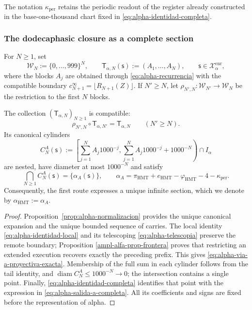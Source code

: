 The notation \(\kappa_{\mathrm{per}}\) retains the periodic readout of the register already constructed in the base-one-thousand chart fixed in \eqref{eq:alpha-identidad-completa}.

\subsubsection{The dodecaphasic closure as a complete section}

For \(N\geq1\), set
\[
 \mathcal W_N:=\{0,\ldots,999\}^{N},
 \qquad
 \mathsf T_{\alpha,N}(\mathsf s):=(A_1,\ldots,A_N),
 \qquad \mathsf s\in\mathcal X_{\alpha}^{\mathrm{enr}},
\]
where the blocks \(A_j\) are obtained through
\eqref{eq:alpha-recurrencia} with the compatible boundary
\(c_{N+1}^{\infty}=\lfloor R_{N+1}(Z)\rfloor\). If \(N'\geq N\), let
\(\rho_{N',N}:\mathcal W_{N'}\to\mathcal W_N\) be the restriction to the
first \(N\) blocks.

\begin{theorem}
\label{thm:alpha-salida-dodecafasica-completa}
The collection \((\mathsf T_{\alpha,N})_{N\geq1}\) is compatible:
\begin{equation}
 \rho_{N',N}\circ\mathsf T_{\alpha,N'}
 =\mathsf T_{\alpha,N}
 \qquad(N'\geq N).
 \label{eq:alpha-via-a-proyectiva-exacta}
\end{equation}
Its canonical cylinders
\begin{equation}
 C_N^A(\mathsf s):=
 \left[
  \sum_{j=1}^{N}A_j1000^{-j},
  \sum_{j=1}^{N}A_j1000^{-j}+1000^{-N}
 \right)\cap I_\alpha
 \label{eq:alpha-cilindros-via-a-exactos}
\end{equation}
are nested, have diameter at most \(1000^{-N}\) and satisfy
\begin{equation}
 \bigcap_{N\geq1}C_N^A(\mathsf s)
 =\{\alpha_A(\mathsf s)\},
 \qquad
 \alpha_A
 =\pi_{\mathrm{HMT}}+e_{\mathrm{HMT}}-\varphi_{\mathrm{HMT}}
  -4-\kappa_{\mathrm{per}}.
 \label{eq:alpha-salida-a-completa}
\end{equation}
Consequently, the first route expresses a unique infinite section, which we
denote by \(\alpha_{\mathrm{HMT}}:=\alpha_A\).
\end{theorem}

\begin{proof}
Proposition~\ref{prop:alpha-normalizacion} provides the unique canonical
expansion and the unique bounded sequence of carries. The local identity
\eqref{eq:alpha-identidad-local} and its telescoping
\eqref{eq:alpha-telescopia} preserve the remote boundary; Proposition
\ref{ampl-alfa-prop-frontera} proves that restricting an extended execution
recovers exactly the preceding prefix. This gives
\eqref{eq:alpha-via-a-proyectiva-exacta}. Membership of the full sum
in each cylinder follows from the tail identity, and
\(\operatorname{diam}C_N^A\leq1000^{-N}\to0\); the intersection contains a
single point. Finally, \eqref{eq:alpha-identidad-completa} identifies that
point with the expression in \eqref{eq:alpha-salida-a-completa}. All its
coefficients and signs are fixed before the representation of alpha.
\end{proof}

